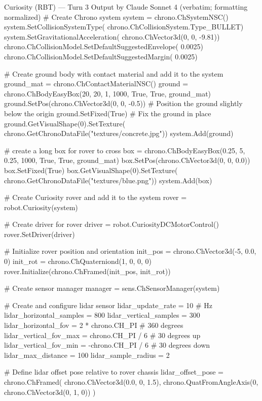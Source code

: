 \documentclass{ieeeaccess}
\begin{document}
\begin{appendices}
\begin{CodeBlock}[breakable]{Curiosity (RBT) --- Turn 3 Output by Claude Sonnet 4 (verbatim; formatting normalized)}
      # Create Chrono system
      system = chrono.ChSystemNSC()
      system.SetCollisionSystemType(
        chrono.ChCollisionSystem.Type_BULLET)
      system.SetGravitationalAcceleration(
        chrono.ChVector3d(0, 0, -9.81))
      chrono.ChCollisionModel.SetDefaultSuggestedEnvelope(
        0.0025)
      chrono.ChCollisionModel.SetDefaultSuggestedMargin(
        0.0025)
      
      # Create ground body with contact material and add it to the system
      ground_mat = chrono.ChContactMaterialNSC()
      ground = chrono.ChBodyEasyBox(20, 20, 1, 1000, True, True, ground_mat)
      ground.SetPos(chrono.ChVector3d(0, 0, -0.5))  # Position the ground slightly below the origin
      ground.SetFixed(True)  # Fix the ground in place
      ground.GetVisualShape(0).SetTexture(
        chrono.GetChronoDataFile("textures/concrete.jpg"))
      system.Add(ground)
      
      # create a long box for rover to cross
      box = chrono.ChBodyEasyBox(0.25, 5, 0.25, 1000, True, True, ground_mat)
      box.SetPos(chrono.ChVector3d(0, 0, 0.0))
      box.SetFixed(True)
      box.GetVisualShape(0).SetTexture(
        chrono.GetChronoDataFile("textures/blue.png"))
      system.Add(box)
      
      # Create Curiosity rover and add it to the system
      rover = robot.Curiosity(system)
      
      # Create driver for rover
      driver = robot.CuriosityDCMotorControl()
      rover.SetDriver(driver)
      
      # Initialize rover position and orientation
      init_pos = chrono.ChVector3d(-5, 0.0, 0)
      init_rot = chrono.ChQuaterniond(1, 0, 0, 0)
      rover.Initialize(chrono.ChFramed(init_pos, init_rot))
      
      # Create sensor manager
      manager = sens.ChSensorManager(system)
      
      # Create and configure lidar sensor
      lidar_update_rate = 10  # Hz
      lidar_horizontal_samples = 800
      lidar_vertical_samples = 300
      lidar_horizontal_fov = 2 * chrono.CH_PI  # 360 degrees
      lidar_vertical_fov_max = chrono.CH_PI / 6  # 30 degrees up
      lidar_vertical_fov_min = -chrono.CH_PI / 6  # 30 degrees down
      lidar_max_distance = 100
      lidar_sample_radius = 2
      
      # Define lidar offset pose relative to rover chassis
      lidar_offset_pose = chrono.ChFramed(
          chrono.ChVector3d(0.0, 0, 1.5), chrono.QuatFromAngleAxis(0, chrono.ChVector3d(0, 1, 0))
      )
      

\end{CodeBlock}
\end{appendices}
\end{document}
